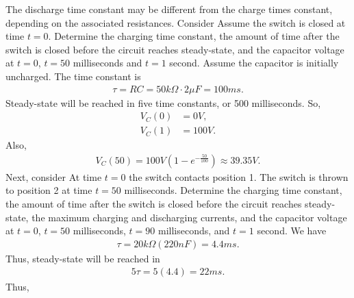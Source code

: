 \documentclass{report}
\begin{document}
\begin{itemize}
            \bigbreak \noindent 
            The discharge time constant may be different from the charge times constant, depending on the associated resistances.
            \bigbreak \noindent 
            Consider
            \bigbreak \noindent 
            \bigbreak \noindent 
            Assume the switch is closed at time $t = 0$. Determine the charging time constant, the amount of time after the switch is closed before the circuit reaches steady-state, and the capacitor voltage at $t = 0$, $t = 50$ milliseconds and $t = 1$ second. Assume the capacitor is initially uncharged.
            \bigbreak \noindent 
            The time constant is 
            \begin{align*}
                \tau = RC = 50k\Omega \cdot 2\mu F = 100ms
            .\end{align*}
            Steady-state will be reached in five time constants, or 500 milliseconds. So,
            \begin{align*}
                V_{C}(0) &= 0V,\\
                V_{C}(1) &= 100V
            .\end{align*}
            Also,
            \begin{align*}
                V_{C}(50) = 100V\left(1-e^{-\frac{50}{100}}\right) \approx 39.35V
            .\end{align*}
            \bigbreak \noindent 
            Next, consider
            \bigbreak \noindent 
            \bigbreak \noindent 
            At time $t = 0$ the switch contacts position 1. The switch is thrown to position 2 at time $t = 50$ milliseconds.
            \bigbreak \noindent 
            Determine the charging time constant, the amount of time after the switch is closed before the circuit reaches steady-state, the maximum charging and discharging currents, and the capacitor voltage at $t = 0$, $t = 50$ milliseconds, $t = 90$ milliseconds, and $t = 1$ second. 
            \bigbreak \noindent 
            We have 
            \begin{align*}
               \tau = 20k\Omega(220nF) = 4.4ms
            .\end{align*}
            Thus, steady-state will be reached in 
            \begin{align*}
                5\tau = 5(4.4) = 22ms
            .\end{align*}
            Thus,
            \begin{align*}

\end{align*}
\end{itemize}
\end{document}
